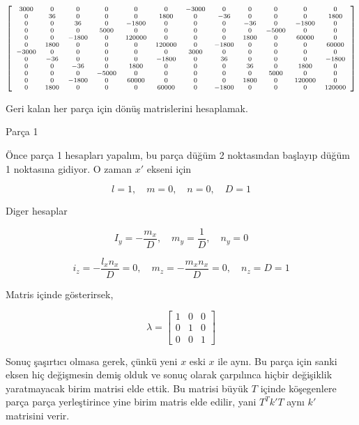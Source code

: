 \documentclass[12pt,fleqn]{article}\usepackage{../../common}
\begin{document}
$$
{\scriptsize
\left[\begin{array}{cccccccccccc}3000 & 0 & 0 & 0 & 0 & 0 & -3000 & 0 & 0 & 0 & 0 & 0\\0 & 36 & 0 & 0 & 0 & 1800 & 0 & -36 & 0 & 0 & 0 & 1800\\0 & 0 & 36 & 0 & -1800 & 0 & 0 & 0 & -36 & 0 & -1800 & 0\\0 & 0 & 0 & 5000 & 0 & 0 & 0 & 0 & 0 & -5000 & 0 & 0\\0 & 0 & -1800 & 0 & 120000 & 0 & 0 & 0 & 1800 & 0 & 60000 & 0\\0 & 1800 & 0 & 0 & 0 & 120000 & 0 & -1800 & 0 & 0 & 0 & 60000\\-3000 & 0 & 0 & 0 & 0 & 0 & 3000 & 0 & 0 & 0 & 0 & 0\\0 & -36 & 0 & 0 & 0 & -1800 & 0 & 36 & 0 & 0 & 0 & -1800\\0 & 0 & -36 & 0 & 1800 & 0 & 0 & 0 & 36 & 0 & 1800 & 0\\0 & 0 & 0 & -5000 & 0 & 0 & 0 & 0 & 0 & 5000 & 0 & 0\\0 & 0 & -1800 & 0 & 60000 & 0 & 0 & 0 & 1800 & 0 & 120000 & 0\\0 & 1800 & 0 & 0 & 0 & 60000 & 0 & -1800 & 0 & 0 & 0 & 120000\end{array}\right]
}
$$

Geri kalan her parça için dönüş matrislerini hesaplamak.

Parça 1

Önce parça 1 hesapları yapalım, bu parça düğüm 2 noktasından başlayıp
düğüm 1 noktasına gidiyor. O zaman $x'$ ekseni için

$$
l = 1, \quad m = 0, \quad n = 0, \quad D = 1
$$

Diger hesaplar

$$
I_y = -\frac{m_x}{D}, \quad
m_y = \frac{1}{D}, \quad
n_y = 0
$$

$$
i_z = -\frac{l_x n_x}{D} = 0, \quad
m_z = -\frac{m_x n_x}{D} = 0, \quad
n_z = D = 1
$$

Matris içinde gösterirsek,

$$
\lambda = \left[\begin{array}{ccc}
1 & 0 & 0 \\ 0 & 1 & 0 \\ 0 & 0 & 1
\end{array}\right]
$$

Sonuç şaşırtıcı olmasa gerek, çünkü yeni $x$ eski $x$ ile aynı. Bu parça için
sanki eksen hiç değişmesin demiş olduk ve sonuç olarak çarpılınca hiçbir
değişiklik yaratmayacak birim matrisi elde ettik. Bu matrisi büyük $T$ içinde
köşegenlere parça parça yerleştirince yine birim matris elde edilir, yani
$T^T k' T$ aynı $k'$ matrisini verir.
\end{document}
